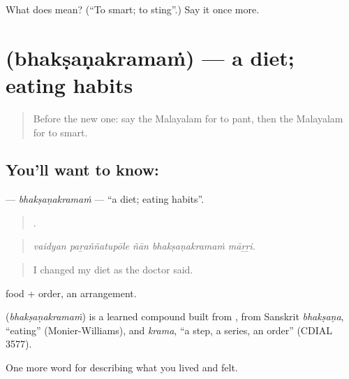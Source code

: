 \begin{tcolorbox}[breakable,colback=teal!4,colframe=teal!35!black,title={Before you move on}]
What does  mean? (\textquotedblleft{}To smart; to sting\textquotedblright{}.) Say it once more.
\end{tcolorbox}
\section[\texorpdfstring{\ml{ഭക്ഷണക്രമം} (bhakṣaṇakramaṁ)}{ഭക്ഷണക്രമം (bhakṣaṇakramaṁ)}]{ (bhakṣaṇakramaṁ) — a diet; eating habits}

\label{lesson:ML-C539-bhaksanakramam}



\begin{quote}
Before the new one: say the Malayalam for to pant, then the Malayalam for to smart.
\end{quote}

\subsection*{You'll want to know: }
\textbf{} — \emph{bhakṣaṇakramaṁ} — \textquotedblleft{}a diet; eating habits\textquotedblright{}.

\begin{quote}
    .
\end{quote}

\begin{quote}
\emph{vaidyan paṟaññatupōle ñān bhakṣaṇakramaṁ māṟṟi.}
\end{quote}

\begin{quote}
I changed my diet as the doctor said.
\end{quote}

 food +  order, an arrangement.

\begin{cousinweb}
\textbf{} (\emph{bhakṣaṇakramaṁ}) is a learned compound built from , from Sanskrit \emph{bhakṣaṇa}, \textquotedblleft{}eating\textquotedblright{} (Monier-Williams), and \emph{krama}, \textquotedblleft{}a step, a series, an order\textquotedblright{} (CDIAL 3577).
\end{cousinweb}

\begin{grammarlens}[title={What you've built}]
One more word for describing what you lived and felt.
\end{grammarlens}

